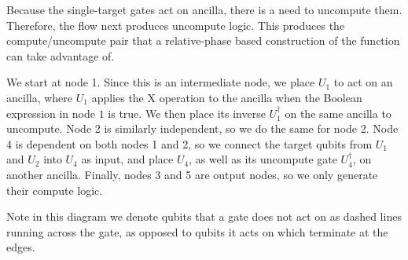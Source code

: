 Because the single-target gates act on ancilla, there is a need to uncompute them. Therefore, the flow next
produces uncompute logic. This produces the compute/uncompute pair that a relative-phase based construction of the
function can take advantage of. 

\begin{example}
  \label{ex-lut}
  We start at node 1. Since this is an intermediate node, we place $U_1$ to act on an ancilla, where $U_1$ applies
  the X operation to the ancilla when the Boolean expression in node $1$ is true. We then place its inverse
  $U_1^{\dagger}$ on the  same ancilla to uncompute. Node 2 is similarly independent, so we do the same for node 2.
  Node 4 is dependent on both nodes 1 and 2, so we connect  the target qubits from $U_1$ and $U_2$ into $U_4$ as
  input, and place $U_4$, as well as its uncompute gate $U_4^{\dagger}$, on another ancilla. Finally, nodes 3 and 5
  are output nodes, so we only generate their compute logic.

  Note in this diagram we denote qubits that a gate does not act on as dashed lines running across the gate, as
  opposed to qubits it acts on which terminate at the edges.

\end{example}


